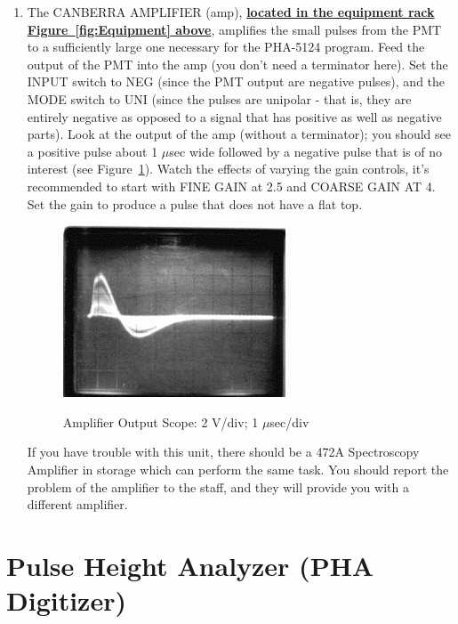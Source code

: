 \documentclass{../lab}
\begin{document}
\begin{enumerate}
    \item The CANBERRA AMPLIFIER (amp), \href{http://experimentationlab.berkeley.edu/sites/default/files/images/GMA_Equip_3518-Lg.jpg}{\textbf{located in the equipment rack Figure~\ref{fig:Equipment} above}}, amplifies the small pulses from the PMT to a sufficiently large one necessary for the PHA-5124 program. Feed the output of the PMT into the amp (you don't need a terminator here). Set the INPUT switch to NEG (since the PMT output are negative pulses), and the MODE switch to UNI (since the pulses are unipolar - that is, they are entirely negative as opposed to a signal that has positive as well as negative parts). Look at the output of the amp (without a terminator); you should see a positive pulse about 1 $\mu$sec wide followed by a negative pulse that is of no interest (see Figure~\ref{fig:250px-GMAimage004}). Watch the effects of varying the gain controls, it's recommended to start with FINE GAIN at 2.5 and COARSE GAIN AT 4. Set the gain to produce a pulse that does not have a flat top.

    \begin{figure}[h]
        \centering
        \href{http://experimentationlab.berkeley.edu/sites/default/files/images/250px-GMAimage004.gif}{\includegraphics[width=0.5\linewidth]{images/250px-GMAimage004.png}}
        \caption{Amplifier Output Scope: 2 V/div; 1 $\mu$sec/div}
        \label{fig:250px-GMAimage004}
    \end{figure}

    If you have trouble with this unit, there should be a 472A Spectroscopy Amplifier in storage which can perform the same task. You should report the problem of the amplifier to the staff, and they will provide you with a different amplifier.

\end{enumerate}

\section{Pulse Height Analyzer (PHA Digitizer)}
\end{document}
